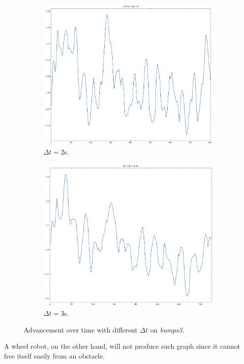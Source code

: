 \documentclass[../document.tex]{subfiles}
\begin{document}
\begin{figure}[H]
    \centering
    \begin{subfigure}[b]{0.45\textwidth}
        \includegraphics[width=\linewidth]{../img/3/find_tr/100-bumps3}
        \caption{$\Delta t = 2$s.}
    \end{subfigure}
        \begin{subfigure}[b]{0.45\textwidth}
        \includegraphics[width=\linewidth]{../img/3/find_tr/150-bumps3}
        \caption{$\Delta t = 3$s.}
    \end{subfigure}
\caption{Advancement over time with different $\Delta t$ on \emph{bumps3}.}
\end{figure}
A wheel robot, on the other hand, will not produce such graph since it cannot free itself easily from an obstacle.
\end{document}
